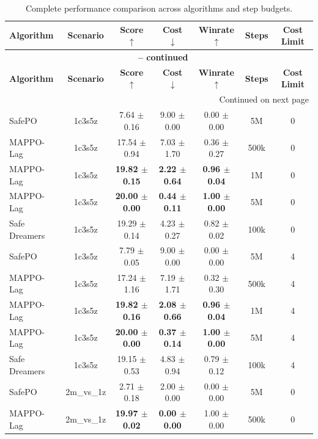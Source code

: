 \documentclass{article}
\begin{document}
\begin{longtable}{lcccccc}
\caption{Complete performance comparison across algorithms and step budgets.}
\label{tab:complete_performance_comparison_100k} \\
\toprule
\textbf{Algorithm} & \textbf{Scenario} & \textbf{Score} $\uparrow$ & \textbf{Cost} $\downarrow$ & \textbf{Winrate} $\uparrow$ & \textbf{Steps} & \textbf{Cost Limit} \\
\midrule
\endfirsthead
\multicolumn{7}{c}{{\bfseries \tablename\ \thetable{} -- continued}} \\
\toprule
\textbf{Algorithm} & \textbf{Scenario} & \textbf{Score} $\uparrow$ & \textbf{Cost} $\downarrow$ & \textbf{Winrate} $\uparrow$ & \textbf{Steps} & \textbf{Cost Limit} \\
\midrule
\endhead
\midrule \multicolumn{7}{r}{{Continued on next page}} \\
\endfoot
\bottomrule
\endlastfoot
SafePO & 1c3s5z & 7.64 $\pm$ 0.16 & 9.00 $\pm$ 0.00 & 0.00 $\pm$ 0.00 & 5M & 0 \\
MAPPO-Lag & 1c3s5z & 17.54 $\pm$ 0.94 & 7.03 $\pm$ 1.70 & 0.36 $\pm$ 0.27 & 500k & 0 \\
MAPPO-Lag & 1c3s5z & \textbf{19.82 $\pm$ 0.15} & \textbf{2.22 $\pm$ 0.64} & \textbf{0.96 $\pm$ 0.04} & 1M & 0 \\
MAPPO-Lag & 1c3s5z & \textbf{20.00 $\pm$ 0.00} & \textbf{0.44 $\pm$ 0.11} & \textbf{1.00 $\pm$ 0.00} & 5M & 0 \\
Safe Dreamers & 1c3s5z & 19.29 $\pm$ 0.14 & 4.23 $\pm$ 0.27 & 0.82 $\pm$ 0.02 & 100k & 0 \\
\midrule
SafePO & 1c3s5z & 7.79 $\pm$ 0.05 & 9.00 $\pm$ 0.00 & 0.00 $\pm$ 0.00 & 5M & 4 \\
MAPPO-Lag & 1c3s5z & 17.24 $\pm$ 1.16 & 7.19 $\pm$ 1.71 & 0.32 $\pm$ 0.30 & 500k & 4 \\
MAPPO-Lag & 1c3s5z & \textbf{19.82 $\pm$ 0.16} & \textbf{2.08 $\pm$ 0.66} & \textbf{0.96 $\pm$ 0.04} & 1M & 4 \\
MAPPO-Lag & 1c3s5z & \textbf{20.00 $\pm$ 0.00} & \textbf{0.37 $\pm$ 0.14} & \textbf{1.00 $\pm$ 0.00} & 5M & 4 \\
Safe Dreamers & 1c3s5z & 19.15 $\pm$ 0.53 & 4.83 $\pm$ 0.94 & 0.79 $\pm$ 0.12 & 100k & 4 \\
\midrule
SafePO & 2m\_vs\_1z & 2.71 $\pm$ 0.18 & 2.00 $\pm$ 0.00 & 0.00 $\pm$ 0.00 & 5M & 0 \\
MAPPO-Lag & 2m\_vs\_1z & \textbf{19.97 $\pm$ 0.02} & \textbf{0.00 $\pm$ 0.00} & 1.00 $\pm$ 0.00 & 500k & 0 \\

\end{longtable}
\end{document}

